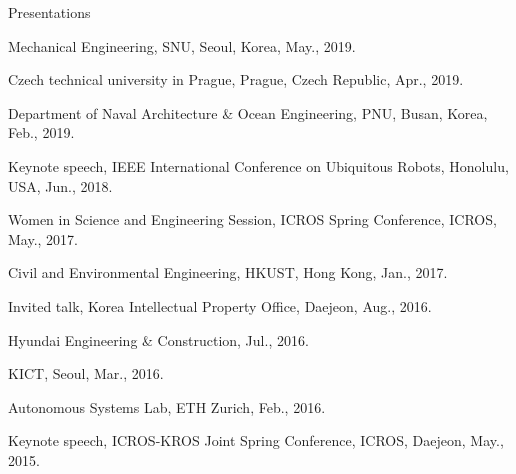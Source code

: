 \begin{rSection}{Presentations}
\begin{pubSubsectionNum}{}
  \item Mechanical Engineering, \ac{SNU}, Seoul, Korea, May., 2019.

  \item Czech technical university in Prague, Prague, Czech Republic, Apr., 2019.

  \item Department of Naval Architecture \& Ocean Engineering, \ac{PNU}, Busan, Korea, Feb., 2019.





  \item Keynote speech, IEEE International Conference on Ubiquitous Robots, Honolulu, USA, Jun., 2018.

  \item Women in Science and Engineering Session, ICROS Spring Conference, \acf{ICROS}, May., 2017.

  \item Civil and Environmental Engineering, \ac{HKUST}, Hong Kong, Jan., 2017.

  \item Invited talk, Korea Intellectual Property Office, Daejeon, Aug., 2016.

  \item Hyundai Engineering \& Construction, Jul., 2016.

  \item \ac{KICT}, Seoul, Mar., 2016.

  \item Autonomous Systems Lab, ETH Zurich, Feb., 2016.

  \item Keynote speech, ICROS-KROS Joint Spring Conference, \ac{ICROS}, Daejeon, May., 2015.


\end{pubSubsectionNum}
\end{rSection}
